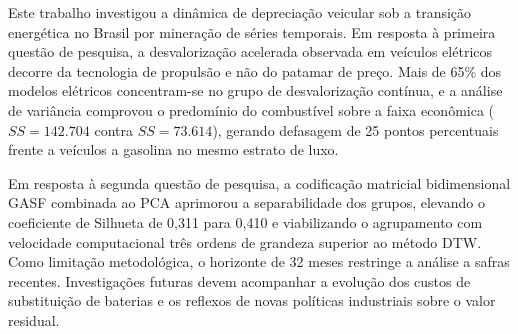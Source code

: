\documentclass[conference]{IEEEtran}
\begin{document}
Este trabalho investigou a dinâmica de depreciação veicular sob a transição energética no Brasil por mineração de séries temporais. Em resposta à primeira questão de pesquisa, a desvalorização acelerada observada em veículos elétricos decorre da tecnologia de propulsão e não do patamar de preço. Mais de 65\% dos modelos elétricos concentram-se no grupo de desvalorização contínua, e a análise de variância comprovou o predomínio do combustível sobre a faixa econômica ($SS = 142.704$ contra $SS = 73.614$), gerando defasagem de 25 pontos percentuais frente a veículos a gasolina no mesmo estrato de luxo.

Em resposta à segunda questão de pesquisa, a codificação matricial bidimensional GASF combinada ao PCA aprimorou a separabilidade dos grupos, elevando o coeficiente de Silhueta de 0,311 para 0,410 e viabilizando o agrupamento com velocidade computacional três ordens de grandeza superior ao método DTW. Como limitação metodológica, o horizonte de 32 meses restringe a análise a safras recentes. Investigações futuras devem acompanhar a evolução dos custos de substituição de baterias e os reflexos de novas políticas industriais sobre o valor residual.



\end{document}
